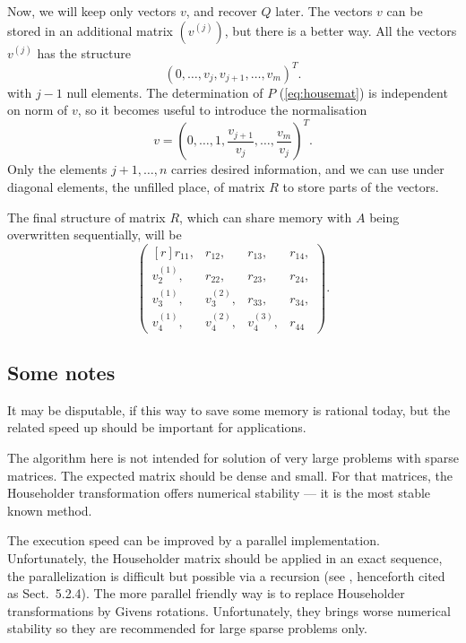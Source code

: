 \begin{refsection}
Now, we will keep only vectors $v$, and recover $Q$ later.
The vectors $v$ can be stored in an additional matrix $(v^{(j)})$,
but there is a better way. All the vectors $v^{(j)}$ has
the structure
\[
(0, \ldots, v_j, v_{j+1}, \ldots, v_m )^T.
\]
with $j-1$ null elements.
The determination of $P$ (\ref{eq:housemat}) is independent
on norm of $v$, so it becomes useful to introduce the normalisation
\begin{equation}
  v = \left( 0, \ldots, 1, \frac{v_{j+1}}{v_j}, \ldots, \frac{v_m}{v_j} \right)^T.
\end{equation}
Only the elements $j+1, \ldots, n$ carries desired information, and we
can use under diagonal elements, the unfilled place, of matrix $R$ to store
parts of the vectors.

The final structure of matrix $R$, which can share memory with
$A$ being overwritten sequentially, will be
\begin{equation}
    \begin{pmatrix*}[r]
      r_{11}, & r_{12}, & r_{13}, & r_{14}, \\
      v_2^{(1)}, & r_{22}, & r_{23}, & r_{24},\\
      v_3^{(1)}, & v_3^{(2)}, & r_{33}, & r_{34},\\
      v_4^{(1)}, & v_4^{(2)}, & v_4^{(3)}, & r_{44}
    \end{pmatrix*}.
\end{equation}


\subsection{Some notes}

It may be disputable, if this way to save some memory is rational
today, but the related speed up should be important for applications.

The algorithm here is not intended for solution of very large
problems with sparse matrices. The expected matrix should be dense
and small. For that matrices, the Householder transformation
offers numerical stability --- it is the most stable known method.

The execution speed can be improved by a parallel implementation.
Unfortunately, the Householder matrix should be applied in an exact
sequence, the parallelization is difficult but possible via
a recursion (see , henceforth cited as \cite{golub2013matrix} Sect.~5.2.4).
The more parallel friendly way is to replace
Householder transformations by Givens rotations.
Unfortunately, they brings worse numerical stability so they
are recommended for large sparse problems only.


\end{refsection}
